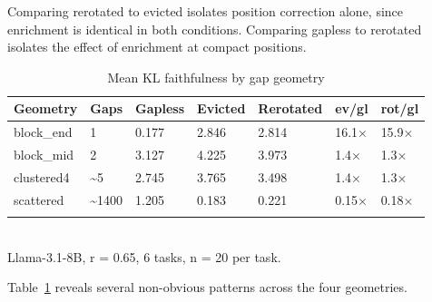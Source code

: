 \documentclass[10pt,letterpaper]{article}
\begin{document}
Comparing rerotated to evicted isolates position correction alone, since
enrichment is identical in both conditions. Comparing gapless to
rerotated isolates the effect of enrichment at compact positions.
\begin{table}[H]
\centering
\small
\caption{Mean KL faithfulness by gap geometry}
\label{tab:t2}
\begin{tabular}{@{}lllllll@{}}
\toprule
Geometry & Gaps & Gapless & Evicted & Rerotated & ev/gl & rot/gl\\
\midrule
block\_end & 1 & 0.177 & 2.846 & 2.814 & 16.1× & 15.9×\\
block\_mid & 2 & 3.127 & 4.225 & 3.973 & 1.4× & 1.3×\\
clustered4 & \textasciitilde5 & 2.745 & 3.765 & 3.498 & 1.4× & 1.3×\\
scattered & \textasciitilde1400 & 1.205 & 0.183 & 0.221 & 0.15× & 0.18×\\
\bottomrule
\\
\end{tabular}
\\Llama-3.1-8B, r = 0.65, 6 tasks, n = 20 per task.
\end{table}

Table~\ref{tab:t2} reveals several non-obvious patterns across the four geometries.
\end{document}
